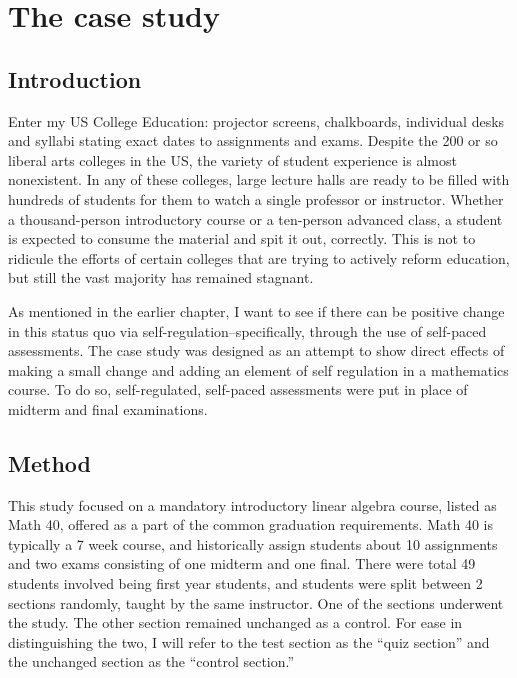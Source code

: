 \chapter{The case study}
\section{Introduction}

Enter my US College Education: projector screens, chalkboards, individual desks and syllabi stating exact dates to assignments and exams. Despite the 200 or so liberal arts colleges in the US, the variety of student experience is almost nonexistent. In any of these colleges, large lecture halls are ready to be filled with hundreds of students for them to watch a single professor or instructor. Whether a thousand-person introductory course or a ten-person advanced class, a student is expected to consume the material and spit it out, correctly. This is not to ridicule the efforts of certain colleges that are trying to actively reform education, but still the vast majority has remained stagnant.

As mentioned in the earlier chapter, I want to see if there can be positive change in this status quo via self-regulation--specifically, through the use of self-paced assessments. The case study was designed as an attempt to show direct effects of making a small change and adding an element of self regulation in a mathematics course. To do so, self-regulated, self-paced assessments were put in place of midterm and final examinations.

\section{Method}
This study focused on a mandatory introductory linear algebra course, listed as Math 40, offered as a part of the common graduation requirements. Math 40 is typically a 7 week course, and historically assign students about 10 assignments and two exams consisting of one midterm and one final. There were total 49 students involved being first year students, and students were split between 2 sections randomly, taught by the same instructor. One of the sections underwent the study. The other section remained unchanged as a control. For ease in distinguishing the two, I will refer to the test section as the ``quiz section'' and the unchanged section as the ``control section.''

